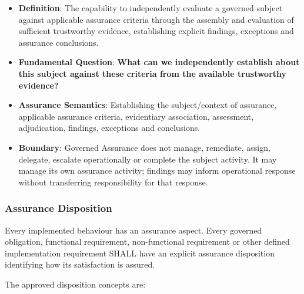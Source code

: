 \begin{itemize}

\item 
\textbf{Definition}: The capability to independently evaluate a governed subject against applicable assurance criteria through the assembly and evaluation of sufficient trustworthy evidence, establishing explicit findings, exceptions and assurance conclusions.



\item 
\textbf{Fundamental Question}: \textbf{What can we independently establish about this subject against these criteria from the available trustworthy evidence?}



\item 
\textbf{Assurance Semantics}: Establishing the subject/\allowbreak{}context of assurance, applicable assurance criteria, evidentiary association, assessment, adjudication, findings, exceptions and conclusions.



\item 
\textbf{Boundary}: Governed Assurance does not manage, remediate, assign, delegate, escalate operationally or complete the subject activity. It may manage its own assurance activity; findings may inform operational response without transferring responsibility for that response.



\end{itemize}
\label{rad:enabling:701}
\subsubsection*{Assurance Disposition}
\label{rad:enabling:703}

Every implemented behaviour has an assurance aspect. Every governed obligation, functional requirement, non-functional requirement or other defined implementation requirement SHALL have an explicit assurance disposition identifying how its satisfaction is assured.

\label{rad:enabling:705}

The approved disposition concepts are:

\label{rad:enabling:707}

